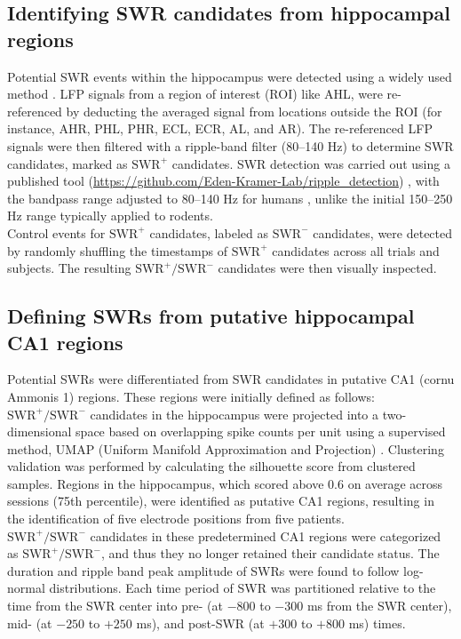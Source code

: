 \documentclass[final,3p,times,twocolumn]{elsarticle}
\begin{document}
\subsection{Identifying SWR candidates from hippocampal regions}
Potential SWR events within the hippocampus were detected using a widely used method \cite{liu_consensus_2022}. LFP signals from a region of interest (ROI) like AHL, were re-referenced by deducting the averaged signal from locations outside the ROI (for instance, AHR, PHL, PHR, ECL, ECR, AL, and AR). The re-referenced LFP signals were then filtered with a ripple-band filter (80--140 Hz) to determine SWR candidates, marked as $\textrm{SWR}^+$ candidates. SWR detection was carried out using a published tool (\url{https://github.com/Eden-Kramer-Lab/ripple_detection}) \cite{kay_hippocampal_2016}, with the bandpass range adjusted to 80--140 Hz for humans \cite{norman_hippocampal_2019} \cite{norman_hippocampal_2021}, unlike the initial 150--250 Hz range typically applied to rodents.
\\
\indent
Control events for $\textrm{SWR}^+$ candidates, labeled as $\textrm{SWR}^-$ candidates, were detected by randomly shuffling the timestamps of $\textrm{SWR}^+$ candidates across all trials and subjects. The resulting $\textrm{SWR}^+/\textrm{SWR}^-$ candidates were then visually inspected.

\subsection{Defining SWRs from putative hippocampal CA1 regions}
Potential SWRs were differentiated from SWR candidates in putative CA1 (cornu Ammonis 1) regions. These regions were initially defined as follows: $\textrm{SWR}^+/\textrm{SWR}^-$ candidates in the hippocampus were projected into a two-dimensional space based on overlapping spike counts per unit using a supervised method, UMAP (Uniform Manifold Approximation and Projection) \cite{mcinnes_umap_2018}. Clustering validation was performed by calculating the silhouette score \cite{rousseeuw_silhouettes_1987} from clustered samples. Regions in the hippocampus, which scored above 0.6 on average across sessions (75th percentile), were identified as putative CA1 regions, resulting in the identification of five electrode positions from five patients.
\\
\indent
$\textrm{SWR}^+/\textrm{SWR}^-$ candidates in these predetermined CA1 regions were categorized as $\textrm{SWR}^+/\textrm{SWR}^-$, and thus they no longer retained their candidate status. The duration and ripple band peak amplitude of SWRs were found to follow log-normal distributions. Each time period of SWR was partitioned relative to the time from the SWR center into pre- (at $-800$ to $-300$ ms from the SWR center), mid- (at $-250$ to $+250$ ms), and post-SWR (at $+300$ to $+800$ ms) times.
\\
\indent
\end{document}
